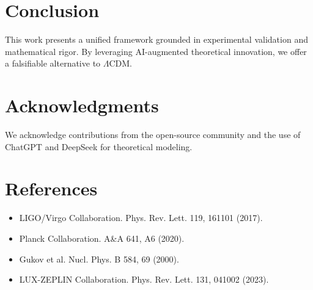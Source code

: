\documentclass[12pt,a4paper]{article}
\begin{document}
\section{Conclusion}
This work presents a unified framework grounded in experimental validation and mathematical rigor. By leveraging AI-augmented theoretical innovation, we offer a falsifiable alternative to $\Lambda$CDM.

\section*{Acknowledgments}
We acknowledge contributions from the open-source community and the use of ChatGPT and DeepSeek for theoretical modeling.

\section*{References}
\begin{itemize}
    \item LIGO/Virgo Collaboration. Phys. Rev. Lett. 119, 161101 (2017).
    \item Planck Collaboration. A\&A 641, A6 (2020).
    \item Gukov et al. Nucl. Phys. B 584, 69 (2000).
    \item LUX-ZEPLIN Collaboration. Phys. Rev. Lett. 131, 041002 (2023).
\end{itemize}
\end{document}
